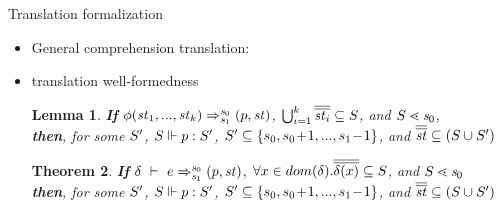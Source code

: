 \documentclass{beamer}
\newtheorem{thm}{Theorem}
\newtheorem{lem}[thm]{Lemma}
\begin{document}
\begin{frame}{Translation formalization}
\begin{itemize}
	\item General comprehension translation: 

\vspace{1.0cm}	

\vspace{1.0cm}	
 	
	\item translation well-formedness {\footnotesize 
	\begin{lem} 
	\textbf{If} $\Transf{\hcall}{\replc k {\st}} {\s_0} {\s_1} {\sfun{p}{\st}}$,  $\bigcup_{i=1}^{k}\olol{\st_i} \subseteq \S$, and $\S \.< \s_0$, \\
    \textbf{then}, for some $\S'$, $\wf{p}{\S}{\S'}$, $\S' \subseteq \{s_0, s_0\!+\!1,...,s_1\!-\!1\}$, and $\olol{\st} \subseteq (\S \cup \S')$
	\end{lem}
	
	\begin{thm}
     \textbf{If} $\Trans{\del}{e}{\s_0}{\s_1}{\sfun{p}{\st}}$, 
      $\forall x \in dom(\del). \olol{\del(x)} \subseteq \S$, and $\S \.< \s_0  $ \\
	 \textbf{then}, for some $\S'$, $\wf{p}{\S}{\S'}$, $\S' \subseteq \{s_0,s_0\!+\!1,...,s_1\!-\!1\}$, and $\olol{\st} \subseteq (\S \cup \S')$
	\end{thm}}
\end{itemize}
\end{frame}
\end{document}
